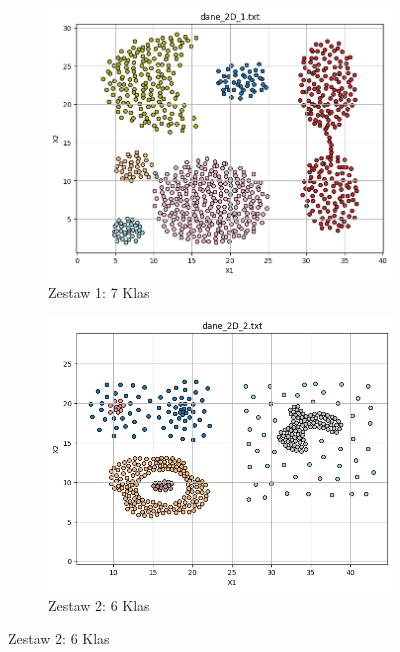 \documentclass[polish,12pt,a4paper]{extarticle}
\begin{document}
\begin{figure}[h!]
    \centering

    \begin{subfigure}[b]{0.30\textwidth}
        \includegraphics[width=\linewidth]{img/spectral/singular/data1.png}
        \captionsetup{labelformat=empty}
        \caption{Zestaw 1: 7 Klas}
    \end{subfigure}
    \hfill
    \begin{subfigure}[b]{0.30\textwidth}
        \includegraphics[width=\linewidth]{img/spectral/singular/data2.png}
        \captionsetup{labelformat=empty}
        \caption{Zestaw 2: 6 Klas}

\end{subfigure}
\end{figure}
\end{document}
